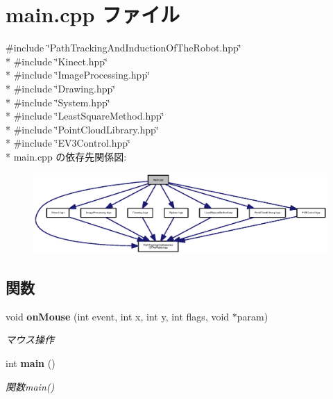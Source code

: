 \section{main.\-cpp ファイル}
\label{main_8cpp}
{\ttfamily \#include \char`\"{}Path\-Tracking\-And\-Induction\-Of\-The\-Robot.\-hpp\char`\"{}}\\*
{\ttfamily \#include \char`\"{}Kinect.\-hpp\char`\"{}}\\*
{\ttfamily \#include \char`\"{}Image\-Processing.\-hpp\char`\"{}}\\*
{\ttfamily \#include \char`\"{}Drawing.\-hpp\char`\"{}}\\*
{\ttfamily \#include \char`\"{}System.\-hpp\char`\"{}}\\*
{\ttfamily \#include \char`\"{}Least\-Square\-Method.\-hpp\char`\"{}}\\*
{\ttfamily \#include \char`\"{}Point\-Cloud\-Library.\-hpp\char`\"{}}\\*
{\ttfamily \#include \char`\"{}E\-V3\-Control.\-hpp\char`\"{}}\\*
main.\-cpp の依存先関係図\-:\nopagebreak
\begin{figure}[H]
\begin{center}
\leavevmode
\includegraphics[width=350pt]{main_8cpp__incl}
\end{center}
\end{figure}
\subsection*{関数}
\begin{DoxyCompactItemize}
\item 
void {\bf on\-Mouse} (int event, int x, int y, int flags, void $\ast$param)
\begin{DoxyCompactList}\small\item\em マウス操作 \end{DoxyCompactList}\item 
int {\bf main} ()
\begin{DoxyCompactList}\small\item\em 関数main() \end{DoxyCompactList}\end{DoxyCompactItemize}
